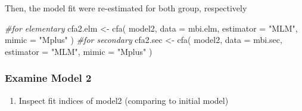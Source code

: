 \documentclass[
]{article}
\newenvironment{Shaded}{\begin{snugshade}}{\end{snugshade}}
\newcommand{\AttributeTok}[1]{\textcolor[rgb]{0.77,0.63,0.00}{#1}}
\newcommand{\CommentTok}[1]{\textcolor[rgb]{0.56,0.35,0.01}{\textit{#1}}}
\newcommand{\FunctionTok}[1]{\textcolor[rgb]{0.00,0.00,0.00}{#1}}
\newcommand{\NormalTok}[1]{#1}
\newcommand{\OtherTok}[1]{\textcolor[rgb]{0.56,0.35,0.01}{#1}}
\newcommand{\StringTok}[1]{\textcolor[rgb]{0.31,0.60,0.02}{#1}}
\providecommand{\tightlist}{%
  \setlength{\itemsep}{0pt}\setlength{\parskip}{0pt}}
\begin{document}
Then, the model fit were re-estimated for both group, respectively

\begin{Shaded}
\begin{Highlighting}[]
\CommentTok{\#for elementary}
\NormalTok{cfa2.elm }\OtherTok{\textless{}{-}} 
  \FunctionTok{cfa}\NormalTok{(}
\NormalTok{    model2, }
    \AttributeTok{data =}\NormalTok{ mbi.elm,  }
    \AttributeTok{estimator =} \StringTok{"MLM"}\NormalTok{,}
    \AttributeTok{mimic =} \StringTok{"Mplus"}
\NormalTok{    )}
\CommentTok{\#for secondary}
\NormalTok{cfa2.sec }\OtherTok{\textless{}{-}} 
  \FunctionTok{cfa}\NormalTok{(}
\NormalTok{    model2, }
    \AttributeTok{data =}\NormalTok{ mbi.sec,  }
    \AttributeTok{estimator =} \StringTok{"MLM"}\NormalTok{,}
    \AttributeTok{mimic =} \StringTok{"Mplus"}
\NormalTok{    )}
\end{Highlighting}
\end{Shaded}

\hypertarget{examine-model-2}{%
\subsubsection{Examine Model 2}\label{examine-model-2}}

\begin{enumerate}
\def\labelenumi{(\arabic{enumi})}
\tightlist
\item
  Inspect fit indices of model2 (comparing to initial model)
\end{enumerate}
\end{document}
